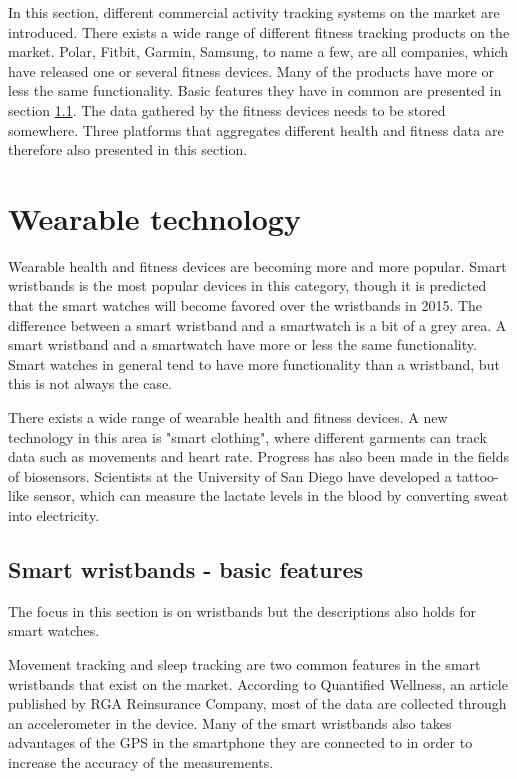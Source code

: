 \documentclass{cslthse-msc}
\begin{document}
In this section, different commercial activity tracking systems on the market are introduced. There exists a wide range of different fitness tracking products on the market. Polar, Fitbit, Garmin, Samsung, to name a few, are all companies, which have released one or several fitness devices. Many of the products have more or less the same functionality. Basic features they have in common are presented in section \ref{sec:Wearable}. The data gathered by the fitness devices needs to be stored somewhere. Three platforms that aggregates different health and fitness data are therefore also presented in this section.

\section{Wearable technology}

Wearable health and fitness devices are becoming more and more popular. Smart wristbands is the most popular devices  in this category, though it is predicted that the smart watches will become favored over the wristbands in 2015\cite{gartner}. The difference between a smart wristband and a smartwatch is a bit of a grey area. A smart wristband and a smartwatch have more or less the same functionality. Smart watches in general tend to have more functionality than a wristband, but this is not always the case. 

There exists a wide range of wearable health and fitness devices. A new technology in this area is "smart clothing", where different garments can track data such as movements and heart rate\cite{callaway2015quantified}. Progress has also been made in the fields of biosensors. Scientists at the University of San Diego have developed a tattoo-like sensor, which can measure the lactate levels in the blood by converting sweat into electricity\cite{tattoo-device}.



\subsection{Smart wristbands - basic features}
\label{sec:Wearable}
The focus in this section is on wristbands but the descriptions also holds for smart watches.

Movement tracking and sleep tracking are two common features in the smart wristbands that exist on the market. According to Quantified Wellness, an article published by RGA Reinsurance Company\cite{callaway2015quantified}, most of the data are collected through an accelerometer in the device. Many of the smart wristbands also takes advantages of the GPS in the smartphone they are connected to in order to increase the accuracy of the measurements.
\end{document}
